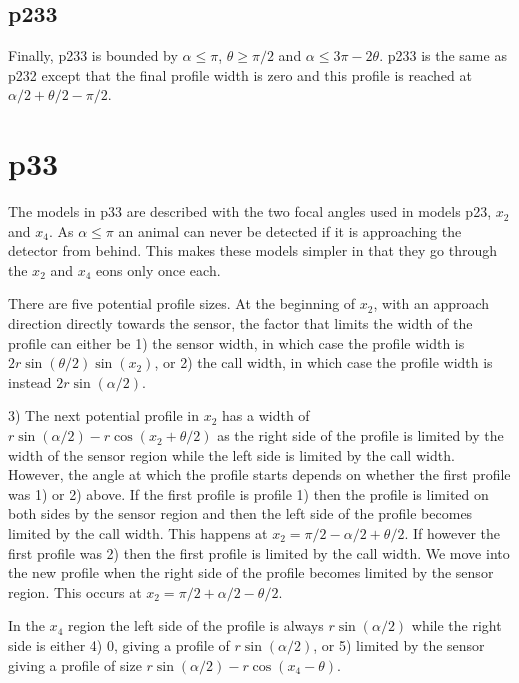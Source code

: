 

\subsection{p233} \label{p233}

Finally, p233 is bounded by $\alpha\le \pi$, $\theta\ge \pi/2$ and $\alpha \le 3\pi - 2\theta$. p233 is the same as p232 except that the final profile width is zero and this profile is reached at $\alpha/2+\theta/2-\pi/2$. 



\section{p33} \label{p33}
 
The models in p33 are described with the two focal angles used in models p23, $x_2$ and $x_4$. As $\alpha \le\pi$ an animal can never be detected if it is approaching the detector from behind. This makes these models simpler in that they go through the $x_2$ and $x_4$ eons only once each. 

There are five potential profile sizes. At the beginning of $x_2$, with an approach direction directly towards the sensor, the factor that limits the width of the profile can either be 1) the sensor width,  in which case the profile width is $2r\sin\left(\theta/2\right)\sin(x_2)$, or 2) the call width, in which case the profile width is instead $2r\sin(\alpha /2)$. 

3) The next potential profile in $x_2$ has a width of $r\sin(\alpha/2) - r\cos(x_2 + \theta/2)$ as the right side of the profile is limited by the width of the sensor region while the left side is limited by the call width. However, the angle at which the profile starts depends on whether the first profile was 1) or 2) above. If the first profile is profile 1) then the profile is limited on both sides by the sensor region and then the left side of the profile becomes limited by the call width. This happens at $x_2 = \pi/2 - \alpha/2 + \theta/2$. If however the first profile was 2) then the first profile is limited by the call width. We move into the new profile when the right side of the profile becomes limited by the sensor region. This occurs at $x_2 = \pi/2 + \alpha/2 - \theta/2$.


In the $x_4$ region the left side of the profile is always $r\sin(\alpha /2)$ while the right side is either 4) 0, giving a profile of $r\sin(\alpha /2)$, or 5) limited by the sensor giving a profile of size $r\sin (\alpha /2) -r\cos(x_4-\theta) $.

